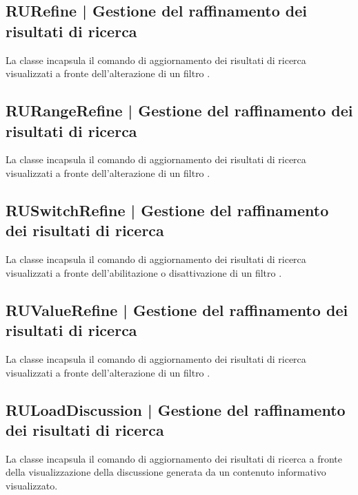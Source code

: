 \documentclass[10pt,a4paper,headinclude,footinclude,hidelinks]{scrreprt} %
\begin{document}
	\subsection[RUListRefine]{RURefine | Gestione del raffinamento dei risultati di ricerca}
	\label{sec:stage:design:controller.search:result-update-list-refine}
	La classe \textit{} incapsula il comando di aggiornamento dei risultati di ricerca visualizzati a fronte dell'alterazione di un filtro \textit{}.

	\subsection[RURangeRefine]{RURangeRefine | Gestione del raffinamento dei risultati di ricerca}
	\label{sec:stage:design:controller.search:result-update-range-refine}
	La classe \textit{} incapsula il comando di aggiornamento dei risultati di ricerca visualizzati a fronte dell'alterazione di un filtro \textit{}.

	\subsection[RUSwitchRefine]{RUSwitchRefine | Gestione del raffinamento dei risultati di ricerca}
	\label{sec:stage:design:controller.search:result-update-switch-refine}
	La classe \textit{} incapsula il comando di aggiornamento dei risultati di ricerca visualizzati a fronte dell'abilitazione o disattivazione di un filtro \textit{}.

	\subsection[RUValueRefine]{RUValueRefine | Gestione del raffinamento dei risultati di ricerca}
	\label{sec:stage:design:controller.search:result-update-value-refine}
	La classe \textit{} incapsula il comando di aggiornamento dei risultati di ricerca visualizzati a fronte dell'alterazione di un filtro \textit{}.

	\subsection[RULoadDiscussion]{RULoadDiscussion | Gestione del raffinamento dei risultati di ricerca}
	\label{sec:stage:design:controller.search:result-update-load-discussion}
	La classe \textit{} incapsula il comando di aggiornamento dei risultati di ricerca a fronte della visualizzazione della discussione generata da un contenuto informativo visualizzato.
\end{document}
